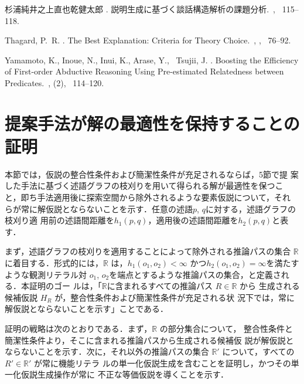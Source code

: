 \documentclass[japanese]{jnlp_1.4}
\begin{document}
\begin{thebibliography}{}
杉浦純\JBA 井之上直也\JBA 乾健太郎 \BBCP.
\newblock 説明生成に基づく談話構造解析の課題分析.\
\newblock {}, \mbox{\BPGS\ 115--118}.

Thagard, P.~R. \BBCP.
\newblock \BBOQ The Best Explanation: Criteria for Theory Choice.\BBCQ\
, {}, \mbox{\BPGS\ 76--92}.

Yamamoto, K., Inoue, N., Inui, K., Arase, Y., \BBA\ Tsujii, J. \BBOP 2015\BBCP.
\newblock \BBOQ Boosting the Efficiency of First-order Abductive Reasoning
  Using Pre-estimated Relatedness between Predicates.\BBCQ\
, {\Bbf
  5}  (2), \mbox{\BPGS\ 114--120}.

\end{thebibliography}


\appendix
\renewcommand\proofname{\bf 証明}

\section{提案手法が解の最適性を保持することの証明}

本節では，仮説の整合性条件および簡潔性条件が充足されるならば，5節で提
案した手法に基づく述語グラフの枝刈りを用いて得られる解が最適性を保つこ
と，即ち手法適用後に探索空間から除外されるような要素仮説について，それ
らが常に解仮説とならないことを示す．任意の述語$p$, $q$に対する，述語グラフの枝刈り適
用前の述語間距離を$h_1(p,q)$，適用後の述語間距離を$h_2(p,q)$と表す．

まず，述語グラフの枝刈りを適用することによって除外される推論パスの集合
$\mathbb{R}$ に着目する．形式的には，$\mathbb{R}$ は，$h_1(o_1,o_2) <
\infty$ かつ$h_2(o_1,o_2) = \infty$を満たすような観測リテラル対
$o_1$, $o_2$を端点とするような推論パスの集合，と定義される．本証明のゴー
ルは，「$\mathbb{R}$に含まれるすべての推論パス $R \in \mathbb{R}$ から
生成される候補仮説 $H_R$ が，整合性条件および簡潔性条件が充足される状
況下では，常に解仮説とならないことを示す」ことである．

証明の戦略は次のとおりである．まず，$\mathbb{R}$ の部分集合について，
整合性条件と簡潔性条件より，そこに含まれる推論パスから生成される候補仮
説が解仮説とならないことを示す．次に，それ以外の推論パスの集合
$\mathbb{R}'$ について，すべての $R' \in \mathbb{R}'$ が常に機能リテラ
ルの単一化仮説生成を含むことを証明し，かつその単一化仮説生成操作が常に
不正な等価仮説を導くことを示す．
\end{document}
